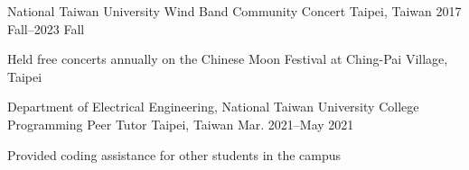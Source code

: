 

\begin{cventries}

    \cventry
        {National Taiwan University Wind Band} %
        {Community Concert} %
        {Taipei, Taiwan } %
        {2017 Fall--2023 Fall} %
        {
          \begin{cvitems} %
            \item Held free concerts annually on the Chinese Moon Festival at Ching-Pai Village, Taipei
          \end{cvitems}
        }
    
    \cventry
        {Department of Electrical Engineering, National Taiwan University} %
        {College Programming Peer Tutor} %
        {Taipei, Taiwan } %
        {Mar. 2021--May 2021} %
        {
          \begin{cvitems} %
            \item Provided coding assistance for other students in the campus
          \end{cvitems}
        }
\end{cventries}